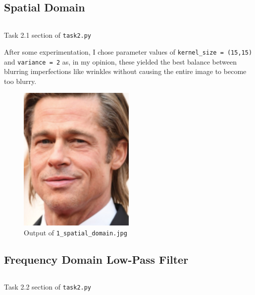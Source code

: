 \documentclass[a4paper]{article}
\newenvironment{code}{\captionsetup{type=listing}}{}
\begin{document}
\subsection{Spatial Domain}
\begin{code}
\inputminted[firstline=5, lastline=13, linenos, breaklines, frame=single]{python}{../code/task2/task2.py}
\caption{Task 2.1 section of \texttt{task2.py}}
\end{code}

After some experimentation, I chose parameter values of \texttt{kernel_size = (15,15)} and \texttt{variance = 2} as, in my opinion, these yielded the best balance between blurring imperfections like wrinkles without causing the entire image to become too blurry.

\begin{figure}[H]
    \centering
    \includegraphics[width=0.5\textwidth]{../code/task2/output/1_spatial_domain.jpg}
    \caption{Output of \texttt{1_spatial_domain.jpg}}
\end{figure}

\subsection{Frequency Domain Low-Pass Filter}
\begin{code}
\inputminted[firstline=15, lastline=29, linenos, breaklines, frame=single]{python}{../code/task2/task2.py}
\caption{Task 2.2 section of \texttt{task2.py}}
\end{code}
\end{document}
